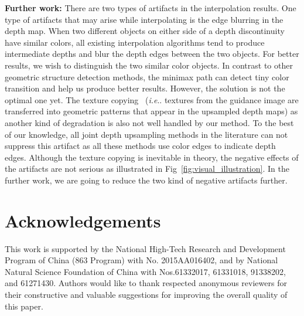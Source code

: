 \documentclass[preprint,10pt,5p,times,twocolumn]{elsarticle}
\makeatletter
\DeclareRobustCommand\onedot{\futurelet\@let@token\@onedot}
\def\@onedot{\ifx\@let@token.\else.\null\fi\xspace}
\def\ie{\emph{i.e}\onedot} \def\Ie{\emph{I.e}\onedot}
\makeatother
\begin{document}
\textbf{Further work:} There are two types of artifacts in the interpolation results. One type of artifacts that may arise while interpolating is the edge blurring in the depth map. When two different objects on either side of a depth discontinuity have similar colors, all existing interpolation algorithms tend to produce intermediate depths and blur the depth edges between the two objects. For better results, we wish to distinguish the two similar color objects. In contrast to other geometric structure detection methods, the minimax path can detect tiny color transition and help us produce better results. However, the solution is not the optimal one yet. The texture copying~\cite{Theobalt2008} (\ie textures from the guidance image are transferred into geometric patterns that appear in the upsampled depth maps) as another kind of degradation is also not well handled by our method. To the best of our knowledge, all joint depth upsampling methods in the literature can not suppress this artifact as all these methods use color edges to indicate depth edges. Although the texture copying is inevitable in theory, the negative effects of the artifacts are not serious as illustrated in Fig~\ref{fig:visual_illustration}. In the further work, we are going to reduce the two kind of negative artifacts further.

\section{Acknowledgements}

This work is supported by the National High-Tech Research and Development Program of China (863 Program) with No. 2015AA016402, and by National Natural Science Foundation of China with Nos.61332017, 61331018, 91338202, and 61271430. Authors would like to thank respected anonymous reviewers for their constructive and valuable suggestions for improving the overall quality of this paper.




\end{document}
